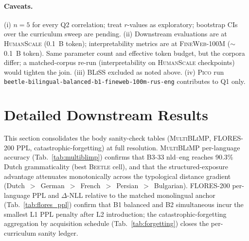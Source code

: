 \paragraph{Caveats.} (i) $n=5$ for every Q2 correlation; treat $r$-values as exploratory; bootstrap CIs over the curriculum sweep are pending. (ii) Downstream evaluations are at \textsc{HumanScale} (0.1~B token); interpretability metrics are at \textsc{FineWeb}-100M ($\sim$0.1~B token). Same parameter count and effective token budget, but the corpora differ; a matched-corpus re-run (interpretability on \textsc{HumanScale} checkpoints) would tighten the join. (iii) \textsc{BLiSS} excluded as noted above. (iv) \textsc{Pico} run \texttt{beetle-bilingual-balanced-b1-fineweb-100m-rus-eng} contributes to Q1 only.

\section{Detailed Downstream Results}\label{sec:downstream}

This section consolidates the body sanity-check tables (\textsc{MultiBLiMP}, \textsc{FLORES-200} PPL, catastrophic-forgetting) at full resolution. \textsc{MultiBLiMP} per-language accuracy (Tab.~\ref{tab:multiblimp}) confirms that B3-33 nld--eng reaches 90.3\% Dutch grammaticality (best \textsc{Beetle} cell), and that the structured-exposure advantage attenuates monotonically across the typological distance gradient (Dutch~$>$~German~$>$~French~$>$~Persian~$>$~Bulgarian). \textsc{FLORES-200} per-language PPL and $\Delta$-NLL relative to the matched monolingual anchor (Tab.~\ref{tab:flores_ppl}) confirm that B1 balanced and B2 simultaneous incur the smallest L1 PPL penalty after L2 introduction; the catastrophic-forgetting aggregation by acquisition schedule (Tab.~\ref{tab:forgetting}) closes the per-curriculum sanity ledger. \label{appcomp:phase}

